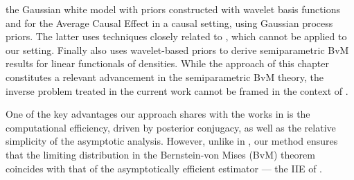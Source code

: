 the Gaussian white model with priors constructed with wavelet basis functions and \cite{26} for the Average Causal Effect in a causal setting, using Gaussian process priors. The latter uses techniques closely related to \cite{37}, which cannot be applied to our setting. Finally \cite{43} also uses wavelet-based priors to derive semiparametric BvM results for linear functionals of densities. While the approach of this chapter constitutes a relevant advancement in the semiparametric BvM theory, the inverse problem treated in the current work cannot be framed in the context of \cite{43}.

One of the key advantages our approach shares with the works in \cite{57,58,54,55,56} is the computational efficiency, driven by posterior conjugacy, as well as the relative simplicity of the asymptotic analysis. However, unlike in \cite{54}, our method ensures that the limiting distribution in the Bernstein-von Mises (BvM) theorem coincides with that of the asymptotically efficient estimator --- the IIE of \cite{27}.  
